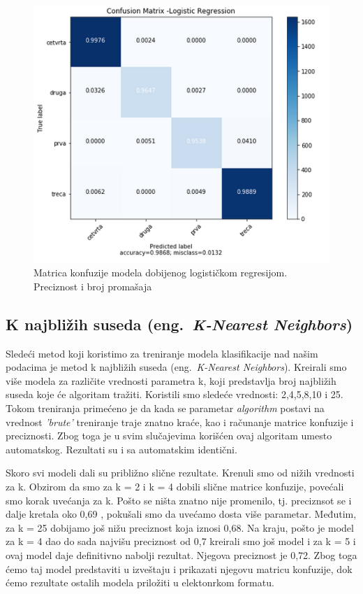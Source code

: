 \documentclass[a4paper]{article}
\begin{document}
\begin{figure}[h!]
\begin{center}
\includegraphics[scale=0.55]{logisticka_regresija_matrica_konfuzije.png}
\end{center}
\caption{Matrica konfuzije modela dobijenog logističkom regresijom. Preciznost i broj promašaja}
\label{fig:logreg_mk}
\end{figure}



\subsection{K najbližih suseda (eng.~{\em K-Nearest Neighbors})}
Sledeći metod koji koristimo za treniranje modela klasifikacije nad našim podacima je metod k najbližih suseda (eng.~{\em K-Nearest Neighbors}). Kreirali smo više modela za različite vrednosti parametra k, koji predstavlja broj najbližih suseda koje će algoritam tražiti. Koristili smo sledeće vrednosti: 2,4,5,8,10 i 25. Tokom treniranja primećeno je da kada se parametar {\em algorithm} postavi na vrednost {\em 'brute'} treniranje traje znatno kraće, kao i računanje matrice konfuzije i preciznosti. Zbog toga je u svim slučajevima korišćen ovaj algoritam umesto automatskog. Rezultati su i sa automatskim identični. 

Skoro svi modeli dali su približno slične rezultate. Krenuli smo od nižih vrednosti za k. Obzirom da smo za k = 2 i k = 4 dobili slične matrice konfuzije, povećali smo korak uvećanja za k. Pošto se ništa znatno nije promenilo, tj. preciznsot se i dalje kretala oko 0,69 , pokušali smo da uvećamo dosta više parametar. Međutim, za k = 25 dobijamo još nižu preciznost koja iznosi 0,68. Na kraju, pošto je model za k = 4 dao do sada najvišu preciznost od 0,7 kreirali smo još model i za k = 5 i ovaj model daje definitivno nabolji rezultat. Njegova preciznost je 0,72. Zbog toga ćemo taj model predstaviti u izveštaju i prikazati njegovu matricu konfuzije, dok ćemo rezultate ostalih modela priložiti u elektonrkom formatu.
\end{document}
